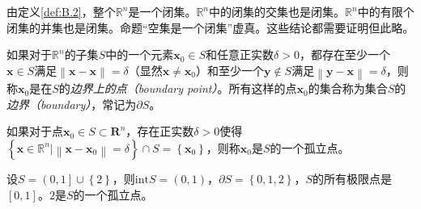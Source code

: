 \documentclass[main.tex]{subfiles}
\begin{document}
由定义\ref{def:B.2}，整个$\mathbb{R}^n$是一个闭集。$\mathbb{R}^n$中的闭集的交集也是闭集。$\mathbb{R}^n$中的有限个闭集的并集也是闭集。命题“空集是一个闭集”虚真。这些结论都需要证明但此略。

\begin{definition}[边界]\label{def:B.3}
    如果对于$\mathbb{R}^n$的子集$S$中的一个元素$\mathbf{x}_0\in S$和任意正实数$\delta>0$，都存在至少一个$\mathbf{x}\in S$满足$\left\|\mathbf{x}-\mathbf{x}\right\|=\delta$（显然$\mathbf{x}\neq\mathbf{x}_0$）和至少一个$\mathbf{y}\notin S$满足$\left\|\mathbf{y}-\mathbf{x}\right\|=\delta$，则称$\mathbf{x}_0$是在$S$的\emph{边界上的点（boundary point）}。所有这样的点$\mathbf{x}_0$的集合称为集合$S$的\emph{边界（boundary）}，常记为$\partial S$。
\end{definition}

\begin{definition}[孤立点]\label{def:B.4}
    如果对于点$\mathbf{x}_0\in S\subset\mathbf{R}^n$，存在正实数$\delta>0$使得$\left\{\mathbf{x}\in\mathbb{R}^n|\left\|\mathbf{x}-\mathbf{x}_0\right\|=\delta\right\}\cap S=\left\{\mathbf{x}_0\right\}$，则称$\mathbf{x}_0$是$S$的一个孤立点。
\end{definition}

\begin{example}
    设$S=\left(0,1\right]\cup\left\{2\right\}$，则$\mathrm{int}S=\left(0,1\right)$，$\partial S=\left\{0,1,2\right\}$，$S$的所有极限点是$\left[0,1\right]$。$2$是$S$的一个孤立点。
\end{example}
\end{document}
